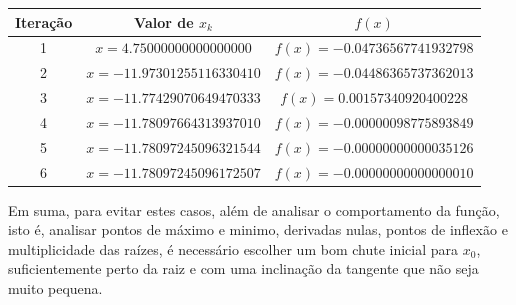 \begin{center}
\small
\begin{tabular}{|c|c|c|}
\hline
Iteração & Valor de $x_k$ & $f(x)$ \\
\hline
1 & $x = 4.75000000000000000$ & $f(x) = -0.04736567741932798$ \\
\hline
2 & $x = -11.97301255116330410$ & $f(x) = -0.04486365737362013$ \\
\hline
3 & $x = -11.77429070649470333$ & $f(x) = 0.00157340920400228$ \\
\hline
4 & $x = -11.78097664313937010$ & $f(x) = -0.00000098775893849$ \\
\hline
5 & $x = -11.78097245096321544$ & $f(x) = -0.00000000000035126$ \\
\hline
6 & $x = -11.78097245096172507$ & $f(x) = -0.00000000000000010$ \\
\hline
\end{tabular}
\label{tab:ciladaNR}
\end{center}

Em suma, para evitar estes casos, além de analisar o comportamento da função, isto é, analisar pontos de máximo e minimo, derivadas nulas, pontos de inflexão e multiplicidade das raízes, é necessário escolher um bom chute inicial para $x_0$, suficientemente perto da raiz e com uma inclinação da tangente que não seja muito pequena.

